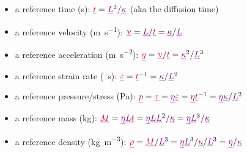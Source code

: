 \documentclass[a4paper,11pt]{article}
\begin{document}
\begin{itemize}
\item a reference time (\si{\second}):
${\color{purple}\underline{t}} = 
{\color{violet} \underline{L}}^2 / {\color{violet} \underline{\kappa}}$ (aka the diffusion time)

\item a reference velocity (\si{\meter\per\second}):
${\color{purple}\underline{\upnu}} = {\color{violet} \underline{L}} / {\color{purple}\underline{t}} 
= {\color{violet} \underline{\kappa}}/{\color{violet} \underline{L}}$

\item a reference acceleration (\si{\meter\per\second^2}):
${\color{purple}\underline{g}} = {\color{purple}\underline{\upnu}} / {\color{purple}\underline{t}} = {\color{violet} \underline{\kappa}}^2/{\color{violet} \underline{L}}^3$

\item a reference strain rate (\si{\per\second}):
${\color{purple}\dot{\underline{\varepsilon}}} = {\color{purple}\underline{t}}^{-1} = {\color{violet} \underline{\kappa}} / {\color{violet} \underline{L}}^2$

\item a reference pressure/stress (\si{\pascal}):
${\color{purple}\underline{p}} = {\color{purple}\underline{\tau}}= {\color{violet}\underline{\eta}} {\color{purple}\dot{\underline{\varepsilon}}} = {\color{violet}\underline{\eta}} {\color{purple}\underline{t}}^{-1} = 
{\color{violet} \underline{\eta}} {\color{violet} \underline{\kappa}} / 
{\color{violet} \underline{L}}^2$

\item a reference mass (\si{\kg}):
${\color{purple}\underline{M}} 
= {\color{violet}\underline{\eta}} {\color{violet}\underline{L}} {\color{purple}\underline{t}}
= {\color{violet}\underline{\eta}} {\color{violet}\underline{L}} {\color{violet}\underline{L}}^2 / {\color{violet}\underline{\kappa}}
= {\color{violet} \underline{\eta}} {\color{violet} \underline{L}}^3/ {\color{violet} \underline{\kappa}}$

\item a reference density (\si{\kg\per\cubic\meter}):
${\color{purple}\underline{\rho}}
= {\color{purple}\underline{M}}/{\color{violet}\underline{L}}^3
= {\color{violet}\underline{\eta}} {\color{violet}\underline{L}}^3/ {\color{violet}\underline{\kappa}} / {\color{violet}\underline{L}}^3
= {\color{violet} \underline{\eta}} / {\color{violet} \underline{\kappa}}$


\end{itemize}
\end{document}
